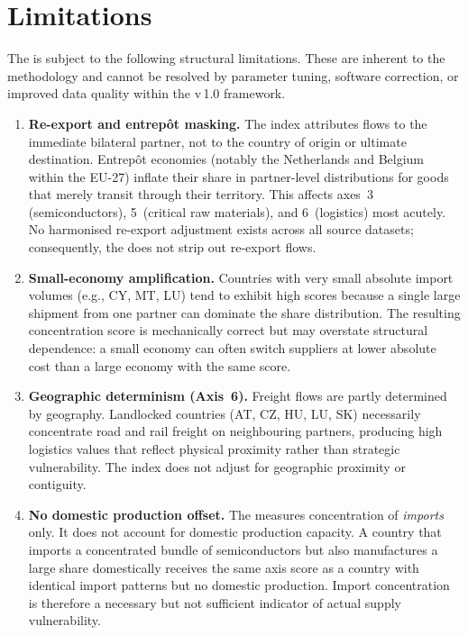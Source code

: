 \section{Limitations}\label{sec:limitations}

The \ISI is subject to the following structural limitations.  These are
inherent to the methodology and cannot be resolved by parameter tuning,
software correction, or improved data quality within the v\,1.0 framework.

\begin{enumerate}[label=\textbf{L\arabic*}.]

  \item \textbf{Re-export and entrepôt masking.}
    The index attributes flows to the immediate bilateral partner, not to
    the country of origin or ultimate destination.  Entrepôt economies
    (notably the Netherlands and Belgium within the EU-27) inflate their
    share in partner-level distributions for goods that merely transit
    through their territory.  This affects axes~3 (semiconductors),
    5~(critical raw materials), and 6~(logistics) most acutely.  No
    harmonised re-export adjustment exists across all source datasets;
    consequently, the \ISI does not strip out re-export flows.

  \item \textbf{Small-economy amplification.}
    Countries with very small absolute import volumes (e.g., CY, MT,
    LU) tend to exhibit high \HHI scores because a single large
    shipment from one partner can dominate the share distribution.
    The resulting concentration score is mechanically correct but may
    overstate structural dependence: a small economy can often switch
    suppliers at lower absolute cost than a large economy with the
    same score.

  \item \textbf{Geographic determinism (Axis~6).}
    Freight flows are partly determined by geography.  Landlocked countries
    (AT, CZ, HU, LU, SK) necessarily concentrate road and rail freight on
    neighbouring partners, producing high logistics \HHI values that
    reflect physical proximity rather than strategic vulnerability.  The
    index does not adjust for geographic proximity or contiguity.

  \item \textbf{No domestic production offset.}
    The \ISI measures concentration of \emph{imports} only.  It does not
    account for domestic production capacity.  A country that imports a
    concentrated bundle of semiconductors but also manufactures a large
    share domestically receives the same axis score as a country with
    identical import patterns but no domestic production.  Import
    concentration is therefore a necessary but not sufficient indicator
    of actual supply vulnerability.


\end{enumerate}
